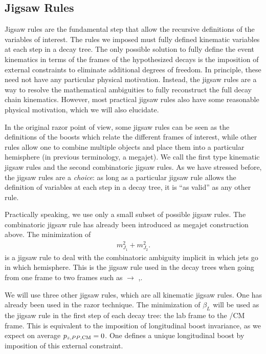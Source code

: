 \subsection{Jigsaw Rules}

Jigsaw rules are the fundamental step that allow the recursive definitions of the variables of interest.
The rules we imposed must fully defined kinematic variables at each step in a decay tree.
The only possible solution to fully define the event kinematics in terms of the frames of the hypothesized decays is the imposition of external constraints to eliminate additional degrees of freedom.
In principle, these need not have any particular physical motivation.
Instead, the jigsaw rules are a way to resolve the mathematical ambiguities to fully reconstruct the full decay chain kinematics.
However, most practical jigsaw rules also have some reasonable physical motivation, which we will also elucidate.

In the original razor point of view, some jigsaw rules can be seen as the definitions of the boosts which relate the different frames of interest, while other rules allow one to combine multiple objects and place them into a particular hemisphere (in previous terminology, a megajet).
We call the first type kinematic jigsaw rules and the second combinatoric jigsaw rules.
As we have stressed before, the jigsaw rules are a \textit{choice}: as long as a particular jigsaw rule allows the definition of variables at each step in a decay tree, it is ``as valid'' as any other rule.

Practically speaking, we use only a small subset of possible jigsaw rules.
The combinatoric jigsaw rule has already been introduced as megajet construction above.
The minimization of
\begin{align}
m_{J_1}^2 + m_{J_2}^2.
\end{align}
is a jigsaw rule to deal with the combinatoric ambiguity implicit in which jets go in which hemisphere.
This is the jigsaw rule used in the decay trees when going from one frame to two frames such as \PP $\rightarrow$ \Pa,\Pb.

We will use three other jigsaw rules, which are all kinematic jigsaw rules.
One has already been used in the razor technique.
The minimization of $\beta_L$ will be used as the jigsaw rule in the first step of each decay tree: the lab frame to the \PP/CM frame.
This is equivalent to the imposition of longitudinal boost invariance, as we expect on average $p_{z,\text{\ensuremath{PP },CM}} = 0$.
One defines a unique longitudinal boost by imposition of this external constraint.

